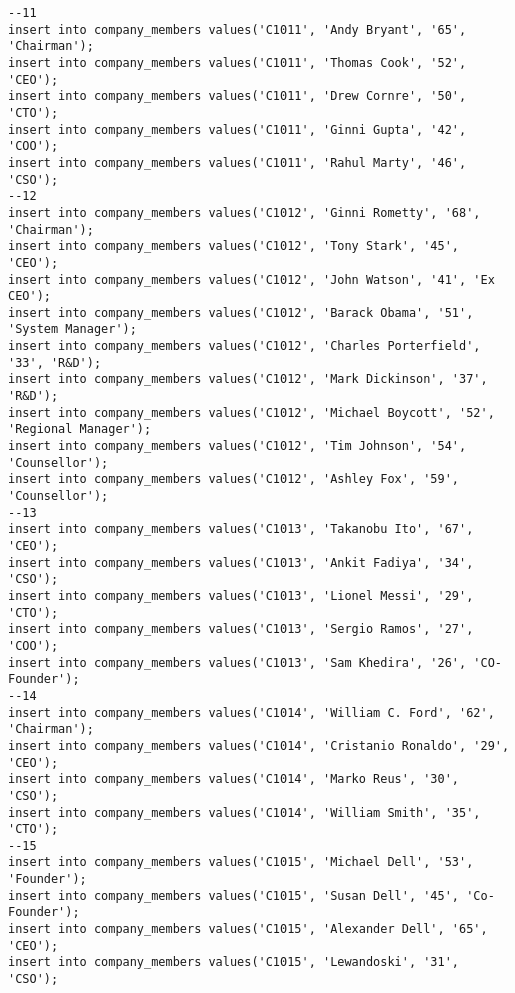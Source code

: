 \documentclass[a4,12pt]{report}
\begin{document}
\begin{lstlisting}
--11
insert into company_members values('C1011', 'Andy Bryant', '65', 'Chairman');
insert into company_members values('C1011', 'Thomas Cook', '52', 'CEO');
insert into company_members values('C1011', 'Drew Cornre', '50', 'CTO');
insert into company_members values('C1011', 'Ginni Gupta', '42', 'COO');
insert into company_members values('C1011', 'Rahul Marty', '46', 'CSO');
--12
insert into company_members values('C1012', 'Ginni Rometty', '68', 'Chairman');
insert into company_members values('C1012', 'Tony Stark', '45', 'CEO');
insert into company_members values('C1012', 'John Watson', '41', 'Ex CEO');
insert into company_members values('C1012', 'Barack Obama', '51', 'System Manager');
insert into company_members values('C1012', 'Charles Porterfield', '33', 'R&D');
insert into company_members values('C1012', 'Mark Dickinson', '37', 'R&D');
insert into company_members values('C1012', 'Michael Boycott', '52', 'Regional Manager');
insert into company_members values('C1012', 'Tim Johnson', '54', 'Counsellor');
insert into company_members values('C1012', 'Ashley Fox', '59', 'Counsellor');
--13
insert into company_members values('C1013', 'Takanobu Ito', '67', 'CEO');
insert into company_members values('C1013', 'Ankit Fadiya', '34', 'CSO');
insert into company_members values('C1013', 'Lionel Messi', '29', 'CTO');
insert into company_members values('C1013', 'Sergio Ramos', '27', 'COO');
insert into company_members values('C1013', 'Sam Khedira', '26', 'CO-Founder');
--14
insert into company_members values('C1014', 'William C. Ford', '62', 'Chairman');
insert into company_members values('C1014', 'Cristanio Ronaldo', '29', 'CEO');
insert into company_members values('C1014', 'Marko Reus', '30', 'CSO');
insert into company_members values('C1014', 'William Smith', '35', 'CTO');
--15
insert into company_members values('C1015', 'Michael Dell', '53', 'Founder');
insert into company_members values('C1015', 'Susan Dell', '45', 'Co-Founder');
insert into company_members values('C1015', 'Alexander Dell', '65', 'CEO');
insert into company_members values('C1015', 'Lewandoski', '31', 'CSO');


\end{lstlisting}
\end{document}
